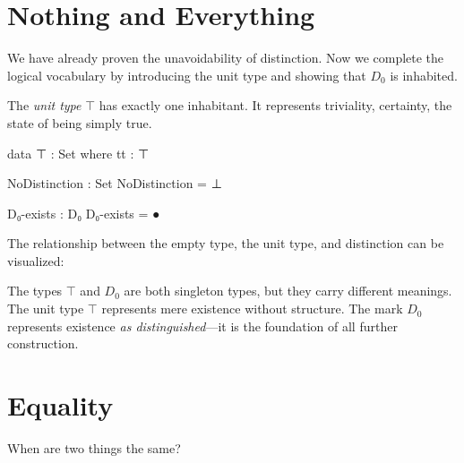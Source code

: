 \documentclass[11pt,a4paper]{book}
\begin{document}
\chapter{Nothing and Everything}

We have already proven the unavoidability of distinction. Now we complete 
the logical vocabulary by introducing the unit type and showing that $D_0$ 
is inhabited.

The \emph{unit type} $\top$ has exactly one inhabitant. It represents 
triviality, certainty, the state of being simply true.

\begin{code}
data ⊤ : Set where
  tt : ⊤

NoDistinction : Set
NoDistinction = ⊥

D₀-exists : D₀
D₀-exists = ●
\end{code}

The relationship between the empty type, the unit type, and distinction 
can be visualized:

\begin{center}
\end{center}

The types $\top$ and $D_0$ are both singleton types, but they carry different 
meanings. The unit type $\top$ represents mere existence without structure. 
The mark $D_0$ represents existence \emph{as distinguished}---it is the 
foundation of all further construction.

\chapter{Equality}

When are two things the same?
\end{document}
